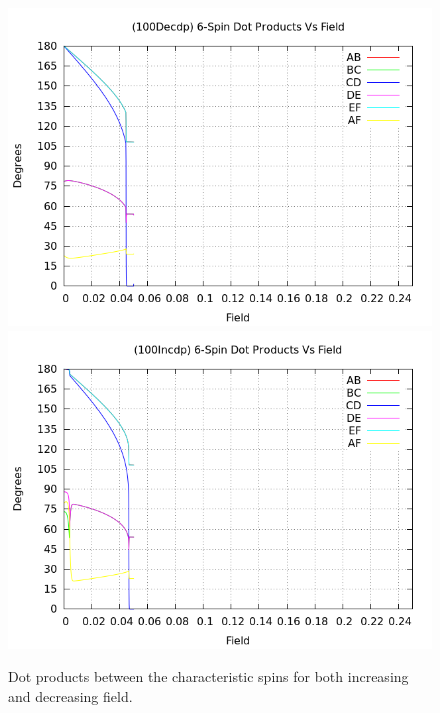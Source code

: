 \documentclass{article}
\begin{document}
\begin{figure}[ht]
\centering
\includegraphics[scale=0.5]{HVariedData/Pictures/100Decdp.png}
\includegraphics[scale=0.5]{HVariedData/Pictures/100Incdp.png}
\caption{Dot products between the characteristic spins for both increasing and decreasing field.}
\end{figure}
\clearpage


\clearpage
\end{document}
